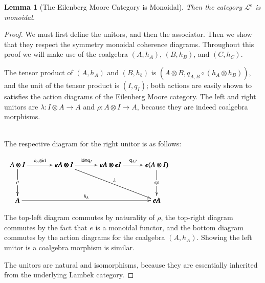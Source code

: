 \documentclass{article}
\newtheorem{lemma}[theorem]{Lemma}
\let\mto\to
\let\to\relax
\newcommand{\to}{\rightarrow}
\newcommand{\cat}[1]{\mathcal{#1}}
\newcommand{\id}[0]{\mathsf{id}}
\newcommand{\q}[1]{\mathsf{q}_{#1}}
\begin{document}
\begin{lemma}[The Eilenberg Moore Category is Monoidal]
  \label{lemma:the_eilenberg_moore_category_is_monoidal}
  Then the category $\cat{L}^e$ is monoidal.
\end{lemma}
\begin{proof}
  We must first define the unitors, and then the associator.  Then we
  show that they respect the symmetry monoidal coherence diagrams.
  Throughout this proof we will make use of the coalgebra $(A,h_A)$,
  $(B,h_B)$, and $(C,h_C)$.

  The tensor product of $(A, h_A)$ and $(B, h_b)$ is $(A \otimes
  B,q_{A,B} \circ (h_A \otimes h_B))$, and the unit of the tensor
  product is $(I, q_I)$; both actions are easily shown to satisfies
  the action diagrams of the Eilenberg Moore category. The left and
  right unitors are $\lambda : I \otimes A \mto A$ and $\rho : A
  \otimes I \mto A$, because they are indeed coalgebra morphisms.

  \ \\
  \noindent
  The respective diagram for the right unitor is as follows:
  \begin{center}
    \begin{math}
      \begin{array}{lll}
        \bfig
        \square|amma|/->`->``/<650,500>[A \otimes I`eA \otimes I`A`;h_A \otimes \id{}`\rho``]
        \morphism(650,500)<650,0>[eA \otimes I`eA \otimes eI;\id{} \otimes \q{I}]
        \square(1300,0)|amma|/->``->`/<650,500>[eA \otimes eI`e(A \otimes I)``eA;\q{A,I}``e\rho`]

        \morphism(650,500)<1300,-500>[eA \otimes I`eA;\lambda]
        \morphism<1950,0>[A`eA;h_A]
        \efig
      \end{array}
    \end{math}
  \end{center}
  The top-left diagram commutes by naturality of $\rho$, the top-right
  diagram commutes by the fact that $e$ is a monoidal functor, and the
  bottom diagram commutes by the action diagrams for the coalgebra
  $(A,h_A)$. Showing the left unitor is a coalgebra morphism is
  similar.

  The unitors are natural and isomorphisms, because they are
  essentially inherited from the underlying Lambek category.


\end{proof}
\end{document}
